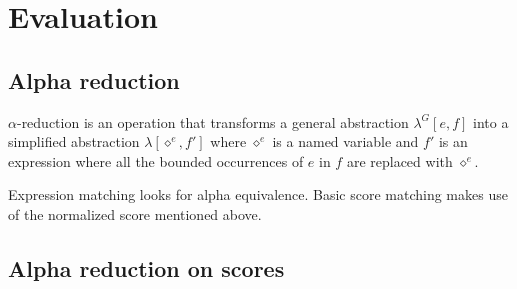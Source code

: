 \documentclass[10pt,a4paper,frenchb]{article}
\makeatletter
\newcommand{\var}[1]		{\ensuremath{\diamond^#1}}
\newcommand{\applyop}	{\ensuremath{@}}
\newcommand{\seq}			{:}
\makeatother
\begin{document}



\section{Evaluation}

\subsection{Alpha reduction}

$\alpha$-reduction is an operation that transforms a general abstraction $\lambda^G[e,f]$ into a simplified abstraction $\lambda[\var{e},f']$ where $\var{e}$ is a named variable and $f'$ is an expression where all the bounded occurrences of $e$ in $f$ are replaced with $\var{e}$.

Expression matching looks for alpha equivalence. Basic score matching makes use of the normalized score mentioned above. 

\subsection{Alpha reduction on scores}
\end{document}
